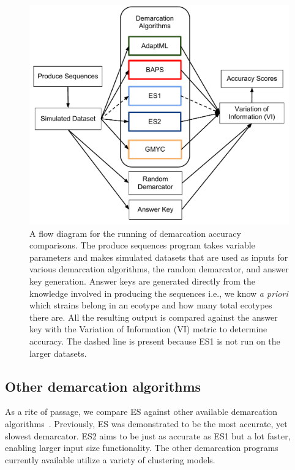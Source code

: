 \begin{figure}[h!]
\centering
\includegraphics[scale=0.75]{images/DemarcationComparisonsFlow-CH4}
\caption[Demarcation comparison flow diagram.]{A flow diagram for the running of demarcation accuracy comparisons. The produce sequences program takes variable parameters and makes simulated datasets that are used as inputs for various demarcation algorithms, the random demarcator, and answer key generation. Answer keys are generated directly from the knowledge involved in producing the sequences i.e., we know \emph{a priori} which strains belong in an ecotype and how many total ecotypes there are. All the resulting output is compared against the answer key with the Variation of Information (VI) metric to determine accuracy. The dashed line is present because ES1 is not run on the larger datasets.}
\label{fig:ComparisonFlow}
\end{figure}

\subsection*{Other demarcation algorithms}
As a rite of passage, we compare ES against other available demarcation algorithms~\cite{carlo}.
Previously, ES was demonstrated to be the most accurate, yet slowest demarcator.
ES2 aims to be just as accurate as ES1 but a lot faster, enabling larger input size functionality.
The other demarcation programs currently available utilize a variety of clustering models.

